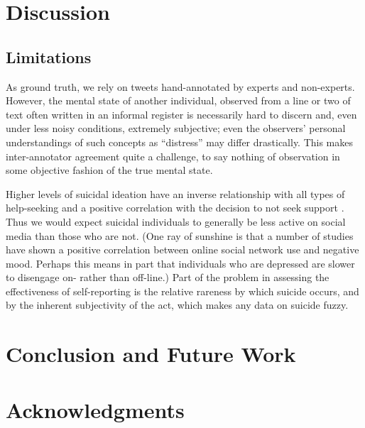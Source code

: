 \documentclass[11pt]{article}
\begin{document}
\section{Discussion}
\subsection{Limitations}
As ground truth, we rely on tweets hand-annotated by experts and non-experts. However, the mental state of another individual, observed from a line or two of text  often written in an informal register is necessarily hard to discern and, even under less noisy conditions, extremely subjective; even the observers' personal understandings of such concepts as ``distress'' may differ drastically. This makes inter-annotator agreement quite a challenge, to say nothing of observation in some objective fashion of the true mental state.


Higher levels of suicidal ideation have an inverse relationship with all types of help-seeking and a positive correlation with the decision to not seek support \cite{deane2001suicidal}. Thus we would expect suicidal individuals to generally be less active on social media than those who are not. (One ray of sunshine is that a number of studies have shown a positive correlation between online social network use and negative mood. Perhaps this means in part that individuals who are depressed are slower to disengage on- rather than off-line.)
 Part of the problem in assessing the effectiveness of self-reporting is the relative rareness by which suicide occurs, and by the inherent subjectivity of the act, which makes any data on suicide fuzzy.
 
\section{Conclusion and Future Work}
\section*{Acknowledgments}






\end{document}
